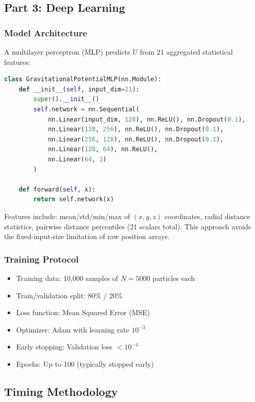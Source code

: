 \documentclass[11pt,a4paper]{article}
\begin{document}
\subsection{Part 3: Deep Learning}

\subsubsection{Model Architecture}

A multilayer perceptron (MLP) predicts $U$ from 21 aggregated statistical features:

\begin{lstlisting}[language=Python, caption={PyTorch MLP architecture}, label={lst:mlp}]
class GravitationalPotentialMLP(nn.Module):
    def __init__(self, input_dim=21):
        super().__init__()
        self.network = nn.Sequential(
            nn.Linear(input_dim, 128), nn.ReLU(), nn.Dropout(0.1),
            nn.Linear(128, 256), nn.ReLU(), nn.Dropout(0.1),
            nn.Linear(256, 128), nn.ReLU(), nn.Dropout(0.1),
            nn.Linear(128, 64), nn.ReLU(),
            nn.Linear(64, 1)
        )

    def forward(self, x):
        return self.network(x)
\end{lstlisting}

Features include: mean/std/min/max of $(x, y, z)$ coordinates, radial distance statistics, pairwise distance percentiles (21 scalars total). This approach avoids the fixed-input-size limitation of raw position arrays.

\subsubsection{Training Protocol}

\begin{itemize}
\item Training data: 10,000 samples of $N=5000$ particles each
\item Train/validation split: 80\% / 20\%
\item Loss function: Mean Squared Error (MSE)
\item Optimizer: Adam with learning rate $10^{-3}$
\item Early stopping: Validation loss $< 10^{-4}$
\item Epochs: Up to 100 (typically stopped early)
\end{itemize}

\subsection{Timing Methodology}
\end{document}
